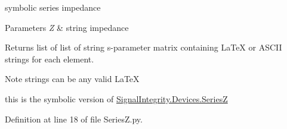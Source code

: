 symbolic series impedance 


\begin{DoxyParams}{Parameters}
{\em Z} & string impedance \\
\hline
\end{DoxyParams}
\begin{DoxyReturn}{Returns}
list of list of string s-\/parameter matrix containing La\+TeX or A\+S\+C\+II strings for each element. 
\end{DoxyReturn}
\begin{DoxyNote}{Note}
strings can be any valid La\+TeX 

this is the symbolic version of \hyperlink{namespaceSignalIntegrity_1_1Devices_1_1SeriesZ}{Signal\+Integrity.\+Devices.\+SeriesZ} 
\end{DoxyNote}


Definition at line 18 of file Series\+Z.\+py.

